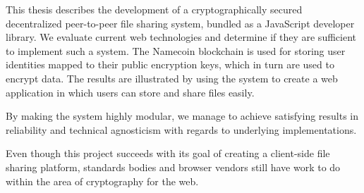 %

This thesis describes the development of a cryptographically secured decentralized peer-to-peer file sharing system, bundled as a JavaScript developer library. We evaluate current web technologies and determine if they are sufficient to implement such a system. The Namecoin blockchain is used for storing user identities mapped to their public encryption keys, which in turn are used to encrypt data. The results are illustrated by using the system to create a web application in which users can store and share files easily. 

By making the system highly modular, we manage to achieve satisfying results in reliability and technical agnosticism with regards to underlying implementations.

Even though this project succeeds with its goal of creating a client-side file sharing platform, standards bodies and browser vendors still have work to do within the area of cryptography for the web.
